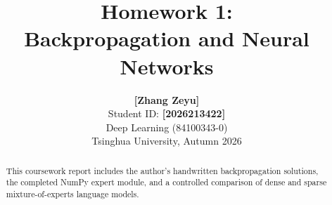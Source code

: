 \documentclass{article}
\title{Homework 1:\\Backpropagation and Neural Networks}
\author{\textbf{[Zhang Zeyu]}\\Student ID: \textbf{[2026213422]}\\Deep Learning (84100343-0)\\Tsinghua University, Autumn 2026}
\begin{document}
\maketitle
{}
\begin{abstract}
This coursework report includes the author's handwritten backpropagation solutions, the completed NumPy expert module, and a controlled comparison of dense and sparse mixture-of-experts language models.
\end{abstract}



\FloatBarrier


\end{document}
